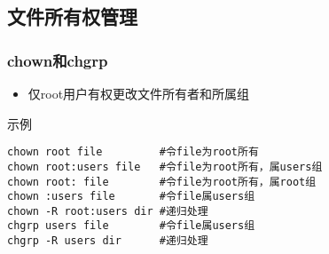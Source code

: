 \documentclass[xcolor=svgnames,presentation]{beamer}
\begin{document}
\subsection{文件所有权管理}
\label{sec-2-2}
\begin{frame}[fragile]
\frametitle{chown和chgrp}
\label{sec-2-2-1}
\begin{itemize}

\item 仅root用户有权更改文件所有者和所属组
\label{sec-2-2-1-1}%
\end{itemize} %
\begin{exampleblock}{示例}
\label{sec-2-2-1-2}


\begin{verbatim}
chown root file         #令file为root所有
chown root:users file   #令file为root所有，属users组
chown root: file        #令file为root所有，属root组
chown :users file       #令file属users组
chown -R root:users dir #递归处理
chgrp users file        #令file属users组
chgrp -R users dir      #递归处理
\end{verbatim}
\end{exampleblock}
\end{frame}
\end{document}
